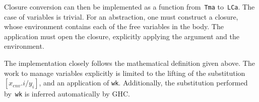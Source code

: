 \documentclass[9pt,authoryear]{sigplanconf}
\begin{document}
%
Closure conversion can then be implemented as a function
    from{~}\texttt{Tm}\texttt{\mbox{\hspace{0.50em}}}\texttt{a} to{~}\texttt{LC}\texttt{\mbox{\hspace{0.50em}}}\texttt{a}. The case of variables is trivial. For
    an abstraction, one must construct a closure, whose environment
    contains each of the free variables in the body. The application
    must open the closure, explicitly applying the argument and the
    environment.%


%
The implementation closely follows the mathematical definition
    given above. The work to manage variables explicitly is limited
    to the lifting of the substitution $ [x_{env}.i/y_i] $, and an
    application of \texttt{wk}. Additionally, the substitution performed
    by{~}\texttt{wk} is inferred automatically by GHC.%


{\nopagebreak }
\end{document}

